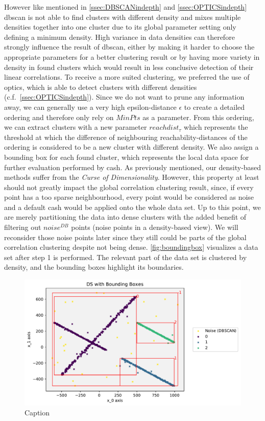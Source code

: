 However like mentioned in \autoref{ssec:DBSCANindepth} and \autoref{ssec:OPTICSindepth} \gls{dbscan} is not able to find clusters with different density and mixes multiple densities together into one cluster due to its global parameter setting only defining a minimum density. High variance in data densities can therefore strongly influence the result of \gls{dbscan}, either by making it harder to choose the appropriate parameters for a better clustering result or by having more variety in density in found clusters which would result in less conclusive detection of their linear correlations. 
To receive a more suited clustering, we preferred the use of \gls{optics}, which is able to detect clusters with different densities (c.f.~\autoref{ssec:OPTICSindepth}). Since we do not want to prune any information away, we can generally use a very high epsilon-distance $\epsilon$ to create a detailed ordering and therefore only rely on $MinPts$ as a parameter. From this ordering, we can extract clusters with a new parameter $reachdist_{\tau}$ which represents the threshold at which the difference of neighbouring reachability-distances of the ordering is considered to be a new cluster with different density. We also assign a bounding box for each found cluster, which represents the local data space for further evaluation performed by \gls{cash}. As previously mentioned, our density-based methods suffer from the \textit{Curse of Dimensionality}. However, this property at least should not greatly impact the global correlation clustering result, since, if every point has a too sparse neighbourhood, every point would be considered as noise and a default \gls{cash} would be applied onto the whole data set. Up to this point, we are merely partitioning the data into dense clusters with the added benefit of filtering out $noise^{DB}$ points (noise points in a density-based view). We will reconsider those noise points later since they still could be parts of the global correlation clustering despite not being dense. \autoref{fig:boundingbox} visualizes a data set after step 1 is performed. The relevant part of the data set is clustered by density, and the bounding boxes highlight its boundaries.

\begin{figure}
    \centering
    \includegraphics[width=.6\textwidth]{figures_method/DSwithBoundingBoxes.pdf}
    \caption{Caption}
    \label{fig:boundingbox}
\end{figure}

